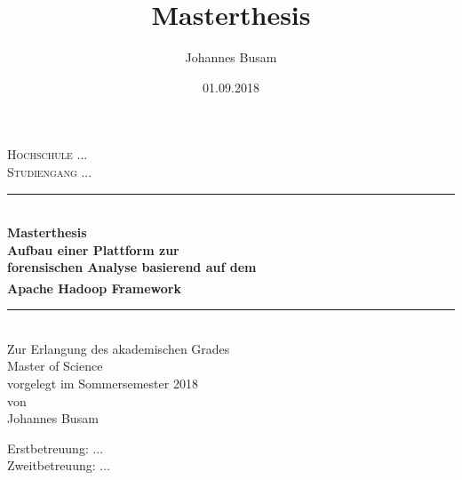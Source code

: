 \documentclass[11pt,a4paper]{report} %
\author{Johannes Busam}
\title{Masterthesis}
\date{01.09.2018}
\begin{document}



\begin{titlepage}

\newcommand{\HRule}{\rule{\linewidth}{0.5mm}} %

\center %
 

\textsc{\LARGE Hochschule ...}\\[0.6cm] %
\textsc{\Large Studiengang ...}\\ %


\HRule \\[0.5cm]
{ \large \bfseries Masterthesis}\\[0.75cm] %
{ \huge \bfseries Aufbau einer Plattform zur\\ forensischen Analyse basierend auf dem\\ Apache Hadoop\textsuperscript{\textregistered} Framework}\\[0.5cm] %
\HRule \\[0.5cm]
 

\Large Zur Erlangung des akademischen Grades\\
\Large Master of Science\\[0.5cm] 

\Large vorgelegt im Sommersemester 2018\\[0.5cm] 

\Large von\\ Johannes Busam 

\begin{flushleft}
Erstbetreuung: ...\\[0.3cm] 

\noindent
Zweitbetreuung: ...\\

\end{flushleft}

\vfill %

\end{titlepage}
\end{document}
